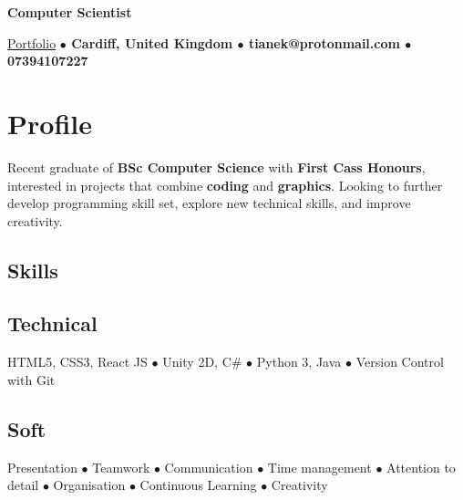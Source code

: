 \documentclass[11pt]{article}
\makeatletter
\newcommand{\verticalline}[1][1pt]{\rule[-0.35ex]{#1}{0.9em}}
\renewcommand{\maketitle}{
\begin{center}
    {\huge\bfseries
    \theauthor \hspace{0.5em}{\verticalline[1.5pt]}\hspace{0.5em}Computer Scientist} 

    \vspace{0.7em}

    \ulink{https://orbit-9j.github.io/Portfolio/}{Portfolio} 
    \textbf{$\bullet$  Cardiff, United Kingdom $\bullet$ tianek@protonmail.com  $\bullet$ 07394107227}
\end{center}
}
\newcommand{\ulink}[2]{\href{#1}{\uline{#2}}}
\makeatother
\begin{document}
    \author{Rin Tian}
    \maketitle

    \section{Profile}
    Recent graduate of \textbf{BSc Computer Science} with \textbf{First Cass Honours}, interested in projects that combine \textbf{coding} and \textbf{graphics}. Looking to further develop programming skill set, explore new technical skills, and improve creativity. 

    \begin{center}
        \section{Skills} 
        \subsection{Technical}
    HTML5, CSS3, React JS $\bullet$ Unity 2D, C\# $\bullet$ Python 3, Java $\bullet$ Version Control with Git
        
        \subsection{Soft}
        Presentation $\bullet$ Teamwork $\bullet$ Communication $\bullet$ Time management $\bullet$ Attention to detail $\bullet$ Organisation $\bullet$ Continuous Learning $\bullet$ Creativity
    \end{center}
   
\end{document}

